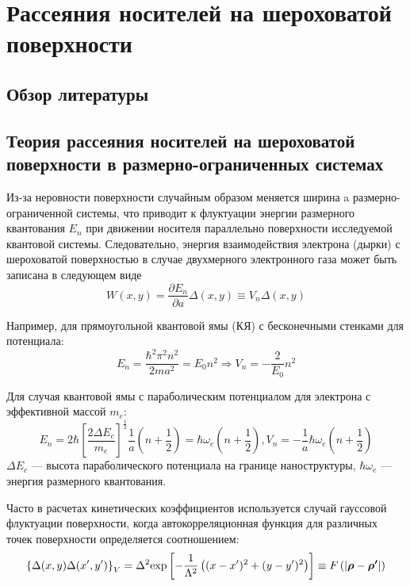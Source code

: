 \chapter{Рассеяния носителей на шероховатой поверхности} \label{chapt1}

\section{Обзор литературы} \label{sect1_1}

\section{Теория рассеяния носителей на шероховатой поверхности в размерно-ограниченных системах} \label{sect1_2}
Из-за неровности поверхности случайным образом меняется ширина a размерно-ограниченной системы, что приводит к флуктуации энергии размерного квантования $E_n$ при движении носителя параллельно поверхности исследуемой квантовой системы. Следовательно, энергия взаимодействия электрона (дырки) с шероховатой поверхностью в случае двухмерного электронного газа может быть записана в следующем виде \cite{Sakaki1987}
\begin{equation}
W(x,y)=\frac{\partial {{E}_{n}}}{\partial a}\Delta (x,y)\equiv {{V}_{n}}\Delta (x,y)
\end{equation}

Например, для прямоугольной квантовой ямы (КЯ) с бесконечными стенками для потенциала:
\begin{equation}
E_n = \frac{\hbar^2 \pi^2 n^2}{2m a^2}=E_0 n^2 \Rightarrow V_n = -\frac{2}{E_0}n^2
\end{equation}

Для случая квантовой ямы с параболическим потенциалом для электрона с эффективной массой $m_e$:
\begin{equation}
E_n=2\hbar {\left[\frac{2\Delta E_c} {m_e}\right]}^{\frac{1}{2}}\frac{1}{a}\left(n+\frac{1}{2}\right) = \hbar \omega_e\left(n+\frac{1}{2}\right), V_n=-\frac{1}{a}\hbar \omega_e\left(n+\frac{1}{2}\right)
\end{equation}
$\Delta E_c$ --- высота параболического потенциала на границе наноструктуры, $\hbar \omega_e$ --- энергия размерного квантования.

Часто в расчетах кинетических коэффициентов используется случай гауссовой флуктуации поверхности, когда автокорреляционная функция для различных точек поверхности определяется соотношением:
\begin{equation}
\left\{\Delta (x,y)\Delta (x',y')\right\}_{V} =\Delta ^{2} {\rm exp}\left[-\frac{1}{\Lambda ^{2} } \left((x-x')^{2} +(y-y')^{2} \right)\right] \equiv F\left(\left|\boldsymbol{\rho} - \boldsymbol{\rho '} \right|\right)
\end{equation}